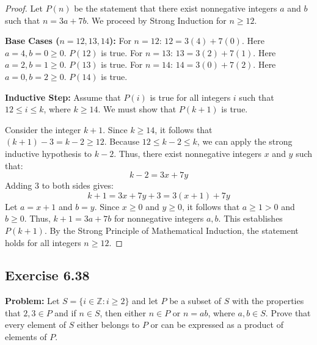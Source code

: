 \documentclass[11pt, a4paper]{article}
\theoremstyle{definition}
\theoremstyle{remark}
\newcommand{\Z}{\mathbb{Z}}
\begin{document}
\begin{proof}
    Let $P(n)$ be the statement that there exist nonnegative integers $a$ and $b$ such that $n = 3a + 7b$. We proceed by Strong Induction for $n \ge 12$.
    
    \textbf{Base Cases ($n=12, 13, 14$):}
    For $n=12$: $12 = 3(4) + 7(0)$. Here $a=4, b=0 \ge 0$. $P(12)$ is true.
    For $n=13$: $13 = 3(2) + 7(1)$. Here $a=2, b=1 \ge 0$. $P(13)$ is true.
    For $n=14$: $14 = 3(0) + 7(2)$. Here $a=0, b=2 \ge 0$. $P(14)$ is true.
    
    \textbf{Inductive Step:}
    Assume that $P(i)$ is true for all integers $i$ such that $12 \le i \le k$, where $k \ge 14$. We must show that $P(k+1)$ is true.
    
    Consider the integer $k+1$. Since $k \ge 14$, it follows that $(k+1) - 3 = k - 2 \ge 12$. 
    Because $12 \le k-2 \le k$, we can apply the strong inductive hypothesis to $k-2$. Thus, there exist nonnegative integers $x$ and $y$ such that:
    \[ k - 2 = 3x + 7y \]
    Adding 3 to both sides gives:
    \[ k + 1 = 3x + 7y + 3 = 3(x+1) + 7y \]
    Let $a = x+1$ and $b = y$. Since $x \ge 0$ and $y \ge 0$, it follows that $a \ge 1 > 0$ and $b \ge 0$. Thus, $k+1 = 3a + 7b$ for nonnegative integers $a, b$.
    This establishes $P(k+1)$. By the Strong Principle of Mathematical Induction, the statement holds for all integers $n \ge 12$.
\end{proof}

\subsection{Exercise 6.38}
\textbf{Problem:} Let $S = \{i \in \Z : i \ge 2\}$ and let $P$ be a subset of $S$ with the properties that $2, 3 \in P$ and if $n \in S$, then either $n \in P$ or $n = ab$, where $a, b \in S$. Prove that every element of $S$ either belongs to $P$ or can be expressed as a product of elements of $P$.
\end{document}

